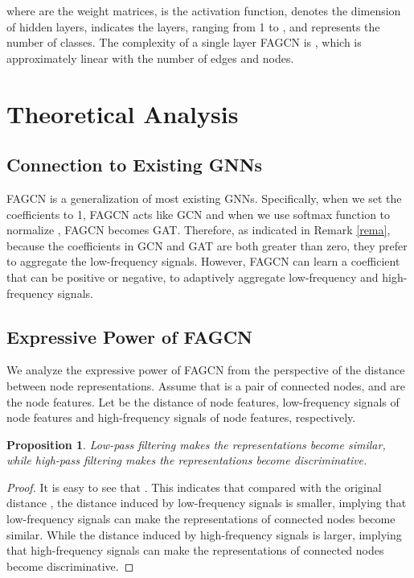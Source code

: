 \documentclass[letterpaper]{article} \usepackage{aaai21}  \usepackage{times}  \usepackage{helvet} \usepackage{courier}  \usepackage[hyphens]{url}  \usepackage{graphicx} \urlstyle{rm} \def\UrlFont{\rm}  \usepackage{natbib}  \usepackage{caption} \frenchspacing  \setlength{\pdfpagewidth}{8.5in}  \setlength{\pdfpageheight}{11in}
\newtheorem{proposition}{Proposition}
\begin{document}
where  are the weight matrices,  is the activation function,  denotes the dimension of hidden layers,  indicates the layers, ranging from 1 to , and  represents the number of classes.
The complexity of a single layer FAGCN is , which is approximately linear with the number of edges and nodes.

\section{Theoretical Analysis}
\label{theory}

\subsection{Connection to Existing GNNs}

FAGCN is a generalization of most existing GNNs. Specifically, when we set the coefficients  to 1, FAGCN acts like GCN and when we use softmax function to normalize , FAGCN becomes GAT.
Therefore, as indicated in Remark \ref{rema}, because the coefficients in GCN and GAT are both greater than zero, they prefer to aggregate the low-frequency signals. However, FAGCN can learn a coefficient that can be positive or negative, to adaptively aggregate low-frequency and high-frequency signals.

\subsection{Expressive Power of FAGCN}
\label{sec:expressive}

We analyze the expressive power of FAGCN from the perspective of the distance between node representations.
Assume that  is a pair of connected nodes, and  are the node features. Let  be the distance of node features, low-frequency signals of node features and high-frequency signals of node features, respectively.




\begin{proposition}
\label{prop1}
	Low-pass filtering makes the representations become similar, while high-pass filtering makes the representations become discriminative.
\end{proposition}

\begin{proof}
	It is easy to see that . 
	This indicates that compared with the original distance , the distance  induced by low-frequency signals is smaller, implying that low-frequency signals can make the representations of connected nodes become similar. 
	While the distance  induced by high-frequency signals is larger, implying that high-frequency signals can make the representations of connected nodes become discriminative.
\end{proof}
\end{document}

